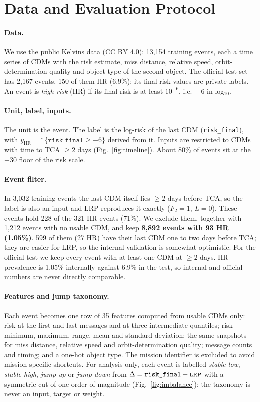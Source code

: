 \documentclass[clean,twocolumn]{bam-proposal}
\newcommand{\HR}{\mathrm{HR}}
\newcommand{\LRP}{\textsc{lrp}}
\begin{document}
\section{Data and Evaluation Protocol}\label{sec:data}

\paragraph{Data.}
We use the public Kelvins data \citep{zenodo4463683} (CC BY 4.0): 13{,}154 training events, each a time series of CDMs with the risk estimate, miss distance, relative speed, orbit-determination quality and object type of the second object. The official test set has 2{,}167 events, 150 of them HR (6.9\%); its final risk values are private labels. An event is \emph{high risk} (HR) if its final risk is at least $10^{-6}$, i.e.\ $-6$ in log$_{10}$.

\paragraph{Unit, label, inputs.}
The unit is the event. The label is the log-risk of the last CDM (\texttt{risk\_final}), with $y_{\HR}=\mathbb 1\{\texttt{risk\_final}\ge -6\}$ derived from it. Inputs are restricted to CDMs with time to TCA $\ge2$ days (Fig.~\ref{fig:timeline}). About 80\% of events sit at the $-30$ floor of the risk scale.

\paragraph{Event filter.}\label{sec:filter}
In 3{,}032 training events the last CDM itself lies $\ge2$ days before TCA, so the label is also an input and LRP reproduces it exactly ($F_2=1$, $L=0$). These events hold 228 of the 321 HR events (71\%). We exclude them, together with 1{,}212 events with no usable CDM, and keep \textbf{8{,}892 events with 93 HR (1.05\%)}. 599 of them (27 HR) have their last CDM one to two days before TCA; they are easier for LRP, so the internal validation is somewhat optimistic. For the official test we keep every event with at least one CDM at $\ge2$ days. HR prevalence is 1.05\% internally against 6.9\% in the test, so internal and official numbers are never directly comparable.

\paragraph{Features and jump taxonomy.}
Each event becomes one row of 35 features computed from usable CDMs only: risk at the first and last messages and at three intermediate quantiles; risk minimum, maximum, range, mean and standard deviation; the same snapshots for miss distance, relative speed and orbit-determination quality; message counts and timing; and a one-hot object type. The mission identifier is excluded to avoid mission-specific shortcuts. For analysis only, each event is labelled \emph{stable-low}, \emph{stable-high}, \emph{jump-up} or \emph{jump-down} from $\Delta=\texttt{risk\_final}-\LRP$ with a symmetric cut of one order of magnitude (Fig.~\ref{fig:imbalance}); the taxonomy is never an input, target or weight.
\end{document}
